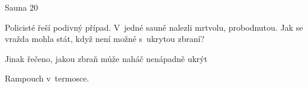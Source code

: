 Sauna
20 %

Policisté řeší podivný případ. V~jedné sauně nalezli mrtvolu, probodnutou.
Jak se vražda mohla stát, když není možné s~ukrytou zbraní?

Jinak řečeno, jakou zbraň může naháč nenápadně ukrýt

Rampouch v~termosce.
